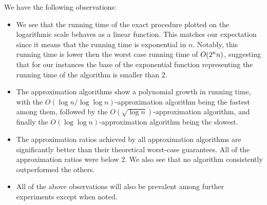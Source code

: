 \FloatBarrier
We have the following observations:
\begin{itemize}
    \item We see that the running time of the exact procedure plotted on the logarithmic scale behaves as a linear function. This matches our expectation since it means that the running time is exponential in $n$. Notably, this running time is lower then the worst case running time of $O\mathopen{}\left( 2^nn \right)$, suggesting that for our instances the base of the exponential function representing the running time of the algorithm is smaller than 2.
    \item The approximation algorithms show a polynomial growth in running time, with the $O(\log n / \log \log n)$-approximation algorithm being the fastest among them, followed by the $O(\sqrt{\log n})$-approximation algorithm, and finally the $O(\log \log n)$-approximation algorithm being the slowest.
    \item The approximation ratios achieved by all approximation algorithms are significantly better than their theoretical worst-case guarantees. All of the approximation ratios were below 2. We also see that no algorithm consistently outperformed the others.
    \item  All of the above observations will also be prevalent among further experiments except when noted.
\end{itemize}

